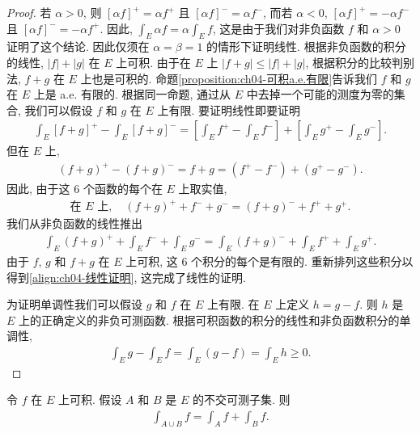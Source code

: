 \documentclass[../../main.tex]{subfiles}
\begin{document}
\begin{proof}
若 $\alpha>0$, 则 $[\alpha f]^{+}=\alpha f^{+}$ 且 $[\alpha f]^{-}=\alpha f^{-}$, 而若 $\alpha<0$, $[\alpha f]^{+}=-\alpha f^{-}$ 且 $[\alpha f]^{-}=-\alpha f^{+}$. 因此, $\int_{E}\alpha f=\alpha\int_{E}f$, 这是由于我们对非负函数 $f$ 和 $\alpha>0$ 证明了这个结论. 因此仅须在 $\alpha=\beta=1$ 的情形下证明线性. 根据非负函数的积分的线性, $|f|+|g|$ 在 $E$ 上可积. 由于在 $E$ 上 $|f+g|\leqslant|f|+|g|$, 根据积分的比较判别法, $f+g$ 在 $E$ 上也是可积的. 命题\cref{proposition:ch04-可积a.e.有限}告诉我们 $f$ 和 $g$ 在 $E$ 上是 a.e. 有限的. 根据同一命题, 通过从 $E$ 中去掉一个可能的测度为零的集合, 我们可以假设 $f$ 和 $g$ 在 $E$ 上有限. 要证明线性即要证明
\begin{align}
\int_{E}[f+g]^{+}-\int_{E}[f+g]^{-}=\left[\int_{E}f^{+}-\int_{E}f^{-}\right]+\left[\int_{E}g^{+}-\int_{E}g^{-}\right].\label{align:ch04-线性证明}
\end{align}
但在 $E$ 上,
\begin{align*}
(f+g)^{+}-(f+g)^{-}=f+g=(f^{+}-f^{-})+(g^{+}-g^{-}).
\end{align*}
因此, 由于这 $6$ 个函数的每个在 $E$ 上取实值,
\begin{align*}
\text{在 }E\text{ 上},\quad(f+g)^{+}+f^{-}+g^{-}=(f+g)^{-}+f^{+}+g^{+}.
\end{align*}
我们从非负函数的线性推出
\begin{align*}
\int_{E}(f+g)^{+}+\int_{E}f^{-}+\int_{E}g^{-}=\int_{E}(f+g)^{-}+\int_{E}f^{+}+\int_{E}g^{+}.
\end{align*}
由于 $f$, $g$ 和 $f+g$ 在 $E$ 上可积, 这 $6$ 个积分的每个是有限的. 重新排列这些积分以得到\eqref{align:ch04-线性证明}, 这完成了线性的证明.

为证明单调性我们可以假设 $g$ 和 $f$ 在 $E$ 上有限. 在 $E$ 上定义 $h=g-f$. 则 $h$ 是 $E$ 上的正确定义的非负可测函数. 根据可积函数的积分的线性和非负函数积分的单调性,
\begin{align*}
\int_{E}g-\int_{E}f=\int_{E}(g-f)=\int_{E}h\geqslant 0.
\end{align*}
\end{proof}

\begin{corollary}[积分在区域上的可加性]\label{corollary:ch04-一般可加}
令 $f$ 在 $E$ 上可积. 假设 $A$ 和 $B$ 是 $E$ 的不交可测子集. 则
\begin{align}
\int_{A\cup B}f=\int_{A}f+\int_{B}f.\label{align:ch04-一般可加}
\end{align}
\end{corollary}
\end{document}
